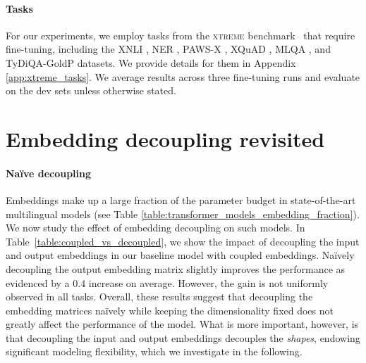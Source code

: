 \documentclass{article} \usepackage{iclr2021_conference,times}
\newcommand{\xtreme}{\textsc{xtreme}\xspace}
\begin{document}
\paragraph{Tasks} For our experiments, we employ tasks from the \xtreme benchmark~\citep{Hu2020} that require fine-tuning, including the XNLI \citep{Conneau2018xnli}, NER \citep{Pan2017}, PAWS-X \citep{Yang2019paws-x}, XQuAD \citep{artetxe2020cross}, MLQA \citep{Lewis2020mlqa}, and TyDiQA-GoldP \citep{Clark2020tydiqa} datasets. We provide details for them in Appendix \ref{app:xtreme_tasks}. We average results across three fine-tuning runs and evaluate on the dev sets unless otherwise stated. 

\section{Embedding decoupling revisited}
\label{sec:embedding_decoupling_revisited}











\paragraph{Na\"ive decoupling} Embeddings make up a large fraction of the parameter budget in state-of-the-art multilingual models (see Table \ref{table:transformer_models_embedding_fraction}). We now study the effect of embedding decoupling on such models. In Table~\ref{table:coupled_vs_decoupled}, we show the impact of decoupling the input and output embeddings in our baseline model with coupled embeddings. Na\"ively decoupling the output embedding matrix slightly improves the performance as evidenced by a 0.4 increase on average. However, the gain is not uniformly observed in all tasks.
Overall, these results suggest that decoupling the embedding matrices na\"ively while keeping the dimensionality fixed does not greatly affect the performance of the model. What is more important, however, is that decoupling the input and output embeddings decouples the \emph{shapes}, endowing significant modeling flexibility, which we investigate in the following.
\end{document}
